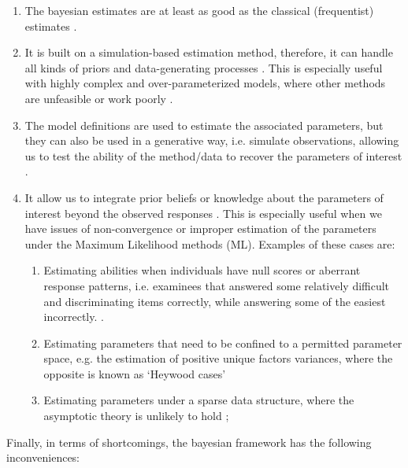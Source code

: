 \begin{enumerate}
	\item The bayesian estimates are at least as good as the classical (frequentist) estimates \cite{Baker_1998, Wollack_2002, Hsieh_2010}. 
	
	\item It is built on a simulation-based estimation method, therefore, it can handle all kinds of priors and data-generating processes \cite{Fox_2010}. This is especially useful with highly complex and over-parameterized models, where other methods are unfeasible or work poorly \cite{Baker_1998, Kim_1999}. 
	
	\item The model definitions are used to estimate the associated parameters, but they can also be used in a generative way, i.e. simulate observations, allowing us to test the ability of the method/data to recover the parameters of interest \cite{McElreath_2020}.
	
	\item It allow us to integrate prior beliefs or knowledge about the parameters of interest beyond the observed responses \cite{Fox_2010, Skrondal_et_al_2004a}. This is especially useful when we have issues of non-convergence or improper estimation of the parameters under the Maximum Likelihood methods (ML). Examples of these cases are:
	
	\begin{enumerate}
		\item Estimating abilities when individuals have null scores or aberrant response patterns, i.e. examinees that answered some relatively difficult and discriminating items correctly, while answering some of the easiest incorrectly. \cite{Hambleton_et_al_1991a, Azevedo_2003}.
		
		\item Estimating parameters that need to be confined to a permitted parameter space, e.g. the estimation of positive unique factors variances, where the opposite is known as ‘Heywood cases’ \cite{Martin_et_al_1975}
			
		\item Estimating parameters under a sparse data structure, where the asymptotic theory is unlikely to hold \cite{Fox_2010};
		
	\end{enumerate}
	
\end{enumerate}

\noindent Finally, in terms of shortcomings, the bayesian framework has the following inconveniences:

